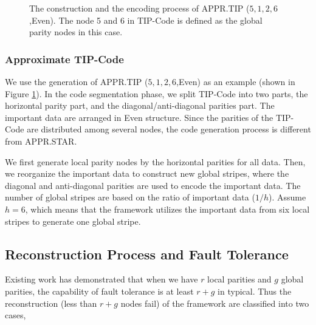 \documentclass[sigconf]{acmart}
\begin{document}
\begin{figure}[ht]
\centering
{}
\hspace{2pt}

\vspace{-3mm}
\caption{The construction and the encoding process of APPR.TIP ($5,1,2,6$,Even). The node 5 and 6 in TIP-Code is defined as the global parity nodes in this case.}\label{fig-ap-TIP}
\vspace{-3mm}
\end{figure}

\subsubsection{Approximate TIP-Code}

We use the generation of APPR.TIP ($5,1,2,6$,Even) as an example (shown in Figure \ref{fig-ap-TIP}). In the code segmentation phase, we split TIP-Code into two parts, the horizontal parity part, and the diagonal/anti-diagonal parities part. The important data are arranged in Even structure. Since the parities of the TIP-Code are distributed among several nodes, the code generation process is different from APPR.STAR.

We first generate local parity nodes by the horizontal parities for all data. Then, we reorganize the important data to construct new global stripes, where the diagonal and anti-diagonal parities are used to encode the important data. The number of global stripes are based on the ratio of important data ($1/h$). Assume $h=6$, which means that the framework utilizes the important data from six local stripes to generate one global stripe.


\subsection{Reconstruction Process and Fault Tolerance}\label{ReconstructionFT}
Existing work \cite{LRC} has demonstrated that when we have $r$ local parities and $g$ global parities, the capability of fault tolerance is at least $r+g$ in typical. Thus the reconstruction (less than $r+g$ nodes fail) of the framework are classified into two cases,
\end{document}
